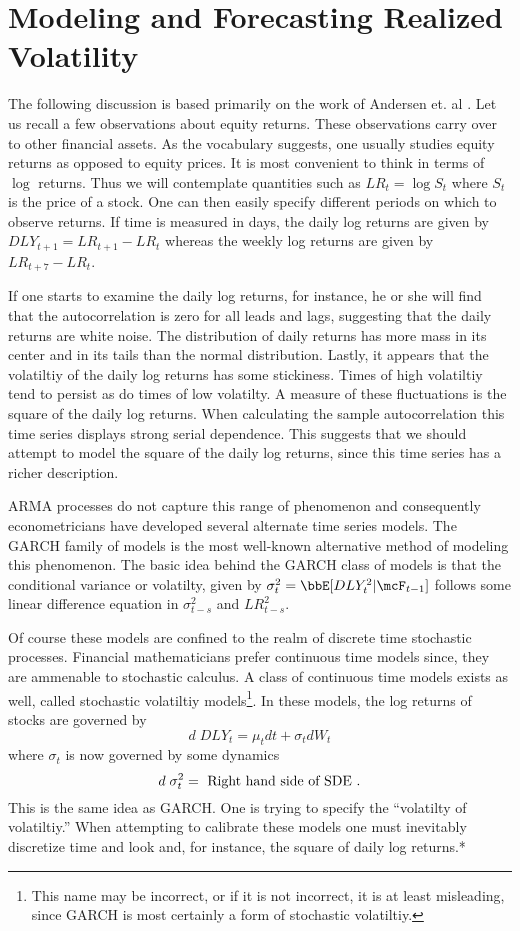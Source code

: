 \documentclass{report}
\begin{document}
\chapter{Modeling and Forecasting Realized Volatility}

The following discussion is based primarily on the work of Andersen et. al \cite{Andersen03}.  Let us recall a few observations about equity returns.  These observations carry over to other financial assets.  As the vocabulary suggests, one usually studies equity returns as opposed to equity prices.  It is most convenient to think in terms of $\log$ returns.  Thus we will contemplate quantities such as $LR_t = \log S_t$ where $S_t$ is the price of a stock.  One can then easily specify different periods on which to observe returns.  If time is measured in days, the daily log returns are given by $DLY_{t+1} = LR_{t+1}-LR_{t}$ whereas the weekly log returns are given by $LR_{t+7}-LR_{t}$.

If one starts to examine the daily log returns, for instance, he or she will find that the autocorrelation is zero for all leads and lags, suggesting that the daily returns are white noise.  The distribution of daily returns has more mass in its center and in its tails than the normal distribution.  Lastly, it appears that the volatiltiy of the daily log returns has some stickiness.  Times of high volatiltiy tend to persist as do times of low volatilty.  A measure of these fluctuations is the square of the daily log returns.  When calculating the sample autocorrelation this time series displays strong serial dependence.  This suggests that we should attempt to model the square of the daily log returns, since this time series has a richer description.

ARMA processes do not capture this range of phenomenon and consequently econometricians have developed several alternate time series models.  The GARCH family of models is the most well-known alternative method of modeling this phenomenon.  The basic idea behind the GARCH class of models is that the conditional variance or volatilty, given by $\sigma_t^2 = \bbE[DLY_t^2 | \mcF_{t-1}]$ follows some linear difference equation in $\sigma_{t-s}^2$ and $LR_{t-s}^2$.

Of course these models are confined to the realm of discrete time stochastic processes.  Financial mathematicians prefer continuous time models since, they are ammenable to stochastic calculus.  A class of continuous time models exists as well, called stochastic volatiltiy models\footnote{This name may be incorrect, or if it is not incorrect, it is at least misleading, since GARCH is most certainly a form of stochastic volatiltiy.}.  In these models, the log returns of stocks are governed by
\[
d \; DLY_t = \mu_t dt + \sigma_t dW_t
\]
where $\sigma_t$ is now governed by some dynamics
\[
d \; \sigma_t^2 = \textmd{ Right hand side of SDE }.
\]
This is the same idea as GARCH.  One is trying to specify the ``volatilty of volatiltiy.''  When attempting to calibrate these models one must inevitably discretize time and look and, for instance, the square of daily log returns.*
\end{document}
